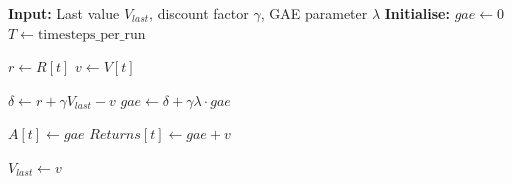 \label{sec:gae-code}

\begin{algorithm}
\caption{Compute Advantages and Returns using GAE.}
\label{alg:gae}
\begin{algorithmic}[1]
    \State \textbf{Input:} Last value $V_{last}$, discount factor $\gamma$, GAE parameter $\lambda$
    \State \textbf{Initialise:} $gae \gets 0$
    \State $T \gets \text{timesteps\_per\_run}$
    
        \State $r \gets R[t]$ 
        \State $v \gets V[t]$ 
        
        \State $\delta \gets r + \gamma V_{last} - v$ 
        \State $gae \gets \delta + \gamma \lambda \cdot gae$ 
        
        \State $A[t] \gets gae$ 
        \State $Returns[t] \gets gae + v$ 
        
        \State $V_{last} \gets v$ 
    \EndFor
\EndProcedure
\end{algorithmic}
\end{algorithm}
